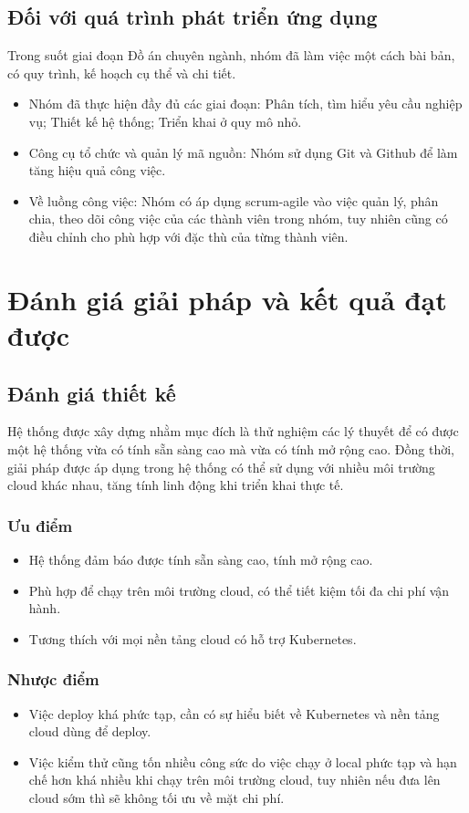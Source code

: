 \subsection{Đối với quá trình phát triển ứng dụng}
\noindent Trong suốt giai đoạn Đồ án chuyên ngành, nhóm đã làm việc một cách bài bản, có quy trình, kế hoạch cụ thể và chi tiết.
\begin{itemize}
    \item Nhóm đã thực hiện đầy đủ các giai đoạn: Phân tích, tìm hiểu yêu cầu nghiệp vụ; Thiết kế hệ thống; Triển khai ở quy mô nhỏ.
    \item Công cụ tổ chức và quản lý mã nguồn: Nhóm sử dụng Git và Github để làm tăng hiệu quả công việc.
    \item Về luồng công việc: Nhóm có áp dụng scrum-agile vào việc quản lý, phân chia, theo dõi công việc của các thành viên trong nhóm, tuy nhiên cũng có điều chỉnh cho phù hợp với đặc thù của từng thành viên.
\end{itemize}
\section{Đánh giá giải pháp và kết quả đạt được}
\subsection{Đánh giá thiết kế}
\noindent Hệ thống được xây dựng nhằm mục đích là thử nghiệm các lý thuyết để có được một hệ thống vừa có tính sẵn sàng cao mà vừa có tính mở rộng cao. Đồng thời, giải pháp được áp dụng trong hệ thống có thể sử dụng với nhiều môi trường cloud khác nhau, tăng tính linh động khi triển khai thực tế.
\subsubsection{Ưu điểm}
\begin{itemize}
    \item Hệ thống đảm báo được tính sẵn sàng cao, tính mở rộng cao.
    \item Phù hợp để chạy trên môi trường cloud, có thể tiết kiệm tối đa chi phí vận hành.
    \item Tương thích với mọi nền tảng cloud có hỗ trợ Kubernetes.
\end{itemize}
\subsubsection{Nhược điểm}
\begin{itemize}
    \item Việc deploy khá phức tạp, cần có sự hiểu biết về Kubernetes và nền tảng cloud dùng để deploy.
    \item Việc kiểm thử cũng tốn nhiều công sức do việc chạy ở local phức tạp và hạn chế hơn khá nhiều khi chạy trên môi trường cloud, tuy nhiên nếu đưa lên cloud sớm thì sẽ không tối ưu về mặt chi phí.
\end{itemize}
